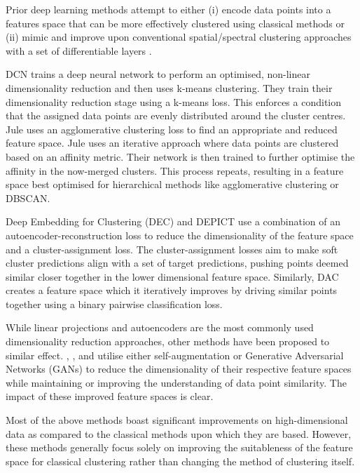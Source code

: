 \documentclass[../thesis.tex]{subfiles}
\begin{document}
Prior deep learning methods attempt to either (i) encode data points into a features space that can be more effectively clustered using classical methods or (ii) mimic and improve upon conventional spatial/spectral clustering approaches with a set of differentiable layers
\cite{aljalbout2018clusteringtaxonomy}.

DCN \cite{Yang2017} trains a deep neural network to perform an optimised, non-linear dimensionality reduction and then uses k-means clustering. They train their dimensionality reduction stage using a k-means loss.
This enforces a condition that the assigned data points are evenly distributed around the cluster centres.
Jule \cite{Yang2016} uses an agglomerative clustering loss to find an appropriate and reduced feature space. Jule uses an iterative approach where data points are clustered based on an affinity metric.
Their network is then trained to further optimise the affinity in the now-merged clusters. This process repeats, resulting in a feature space best optimised for hierarchical methods like agglomerative clustering or DBSCAN. 

Deep Embedding for Clustering (DEC) \cite{Xie2016} and DEPICT \cite{Dizaji2017} use a combination of an autoencoder-reconstruction loss to reduce the dimensionality of the feature space and a cluster-assignment loss. The cluster-assignment losses aim to make soft cluster predictions align with a set of target predictions, pushing points deemed similar closer together in the lower dimensional feature space.
Similarly, DAC \cite{Chang2017} creates a feature space which it iteratively improves by driving similar points together using a binary pairwise classification loss.


While linear projections and autoencoders are the most commonly used dimensionality reduction approaches, other methods have been proposed to similar effect. \citet{Hu2017},  \citet{Hsu2018}, and \citet{VittalPremachandran2017} utilise either self-augmentation or Generative Adversarial Networks (GANs) to reduce the dimensionality of their respective feature spaces while maintaining or improving the understanding of data point similarity.
The impact of these improved feature spaces is clear.

Most of the above methods boast significant improvements on high-dimensional data as compared to the classical methods upon which they are based.
However, these methods generally focus solely on improving the suitableness of the feature space for classical clustering rather than changing the method of clustering itself.
\end{document}
